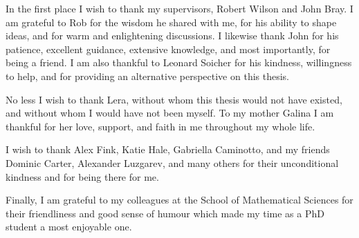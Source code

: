 

\begin{acknowledgements}      %


In the first place I wish to thank my supervisors,
Robert Wilson and John Bray. I am grateful to Rob for the 
wisdom he shared with me, for his ability to shape ideas,
and for warm and enlightening discussions. I likewise thank
John for his patience, excellent guidance, extensive
knowledge, and most importantly, for being a friend. I am also thankful to Leonard Soicher
for his kindness, willingness to help, 
and for providing an alternative perspective
on this thesis.

No less I wish to thank Lera, without whom 
this thesis would not have existed, and without whom I would
have not been myself. To my mother Galina I am thankful for her love,
support, and faith in me throughout my whole life. 

I wish to thank Alex Fink, Katie Hale, Gabriella Caminotto, and my friends 
Dominic Carter, Alexander Luzgarev, and many others for their unconditional kindness 
and for being there for me. 

Finally, I am grateful to my colleagues
at the School of Mathematical Sciences for their friendliness
and good sense of humour which made my time as a PhD student
a most enjoyable one. 


\end{acknowledgements}


